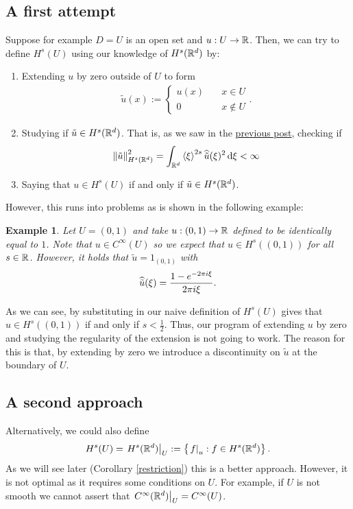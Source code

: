 \documentclass[12pt]{article}
\newtheorem{example}{Example}
\theoremstyle{remark}
\newcommand{\br}[1]{\left\langle#1\right\rangle} \newcommand{\set}[1]{\left\{#1\right\}} \newcommand{\qp}[1]{\left(#1\right)}\newcommand{\qb}[1]{\left[#1\right]}
\renewcommand{\norm}[1]{\left\lVert #1 \right\rVert}\renewcommand{\abs}[1]{\left| #1 \right|}
\renewcommand{\d}{\,\mathrm{d}}
\newcommand\restr[2]{\left.#1\right|_{#2}}
\begin{document}
\subsection{A first attempt}
Suppose for example $D=U$ is an open set and $u: U \to \mathbb{R}$. Then, we can try to define $H^s(U)$ using our knowledge of $H^s(\mathbb{R}^d)$ by:
\begin{enumerate}
	\item Extending $u$ by zero outside of $U$ to form
	      \begin{align*}
		      \tilde{u}(x):=\begin{cases}
			                    u(x) & \quad x \in U     \\
			                    0    & \quad x \not\in U
		                    \end{cases}.
	      \end{align*}
	\item Studying if $\tilde{u} \in  H^s(\mathbb{R}^d)$. That is, as we saw in the \href{https://nowheredifferentiable.com/2023-01-29-PDE-1-Fourier/#:~:text=fact%2C%20since%20the-,Fourier,-transform%20is%20a}{previous post}, checking if
	      \begin{align*}
		      \norm{\tilde{u}}_{H^s(\R^d)}^2= \int_{\R^d}\br{\xi }^{2s}\wh{\tilde{u}}(\xi )^2 \d \xi < \infty
	      \end{align*}
	\item Saying that $u \in H^s(U)$ if and only if $\tilde{u} \in H^s(\mathbb{R}^d)$.
\end{enumerate}
However, this runs into problems as is shown in the following example:
\begin{example}
	Let $U=(0,1)$ and take $u: (0,1) \to \mathbb{R}$ defined to be identically equal to  $1$. Note that  $u \in C^\infty(U)$ so we expect that $u \in H^s((0,1))$ for all $s \in \mathbb{R}$. However, it holds that $\tilde{u}= {1}_{(0,1)}$ with
	\begin{align*}
		\widehat{\tilde{u}}(\xi )=\frac{1-e^{-2 \pi i \xi }}{2 \pi i \xi }.
	\end{align*}
\end{example}
As we can see, by substituting in our naive definition of $H^s(U)$ gives that $u \in H^s((0,1))$ if and only if $s< \frac{1}{2}$. Thus, our program of extending $u$ by zero and studying the regularity of the extension is not going to work. The reason for this is that, by extending by zero we introduce a discontinuity on $\tilde{u}$ at the boundary of $U$.
\subsection{A second approach}
Alternatively, we could also define
\begin{align*}
	H^s(U)= \restr{H^s(\R^d)}{U}:= \set{\restr{f}{u}: f \in H^s(\R^d)} .
\end{align*}
As we will see later (Corollary \ref{restriction}) this is a better approach. However, it is not optimal as it requires some conditions on $U$. For example, if $U$ is not smooth we cannot assert that  $\restr{C^\infty(\R^d)}{U}= C^\infty(U)$.
\end{document}
